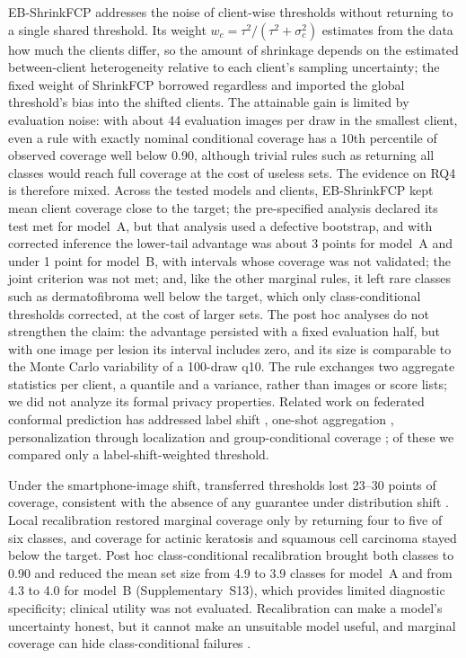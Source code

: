 \documentclass[VANCOUVER,Times1COL]{WileyNJDv5}
\begin{document}
EB-ShrinkFCP addresses the noise of client-wise thresholds without returning to a single shared threshold.
Its weight $w_c=\tau^2/(\tau^2+\sigma_c^2)$ estimates from the data how much the clients differ, so the amount of shrinkage depends on the estimated between-client heterogeneity relative to each client's sampling uncertainty; the fixed weight of ShrinkFCP borrowed regardless and imported the
global threshold's bias into the shifted clients. The attainable gain is limited by evaluation noise: with
about 44 evaluation images per draw in the smallest client, even a rule with exactly nominal conditional
coverage has a 10th percentile of observed coverage well below 0.90, although trivial rules such as
returning all classes would reach full coverage at the cost of useless sets. The evidence on RQ4 is
therefore mixed. Across the tested models and clients, EB-ShrinkFCP kept mean client coverage close to the
target; the pre-specified analysis declared its test met for model~A, but that analysis used a defective bootstrap, and with corrected inference the lower-tail advantage was about 3 points for model~A and under 1 point for model~B, with intervals whose coverage was not validated; the joint criterion was not met; and, like the other marginal rules, it left rare classes such as dermatofibroma well below the
target, which only class-conditional thresholds corrected, at the cost of larger sets. The post hoc analyses do not strengthen the claim: the advantage persisted with a fixed evaluation half, but with one image per lesion its interval includes zero, and its size is comparable to the Monte Carlo variability of a 100-draw q10. The rule exchanges two
aggregate statistics per client, a quantile and a variance, rather than images or score lists; we did not
analyze its formal privacy properties. Related work on federated conformal prediction has addressed label
shift \cite{plassier2023labelshift}, one-shot aggregation \cite{humbert2023oneshot}, personalization
through localization \cite{min2025pfcp} and group-conditional coverage \cite{wen2026gcfcp}; of these we
compared only a label-shift-weighted threshold.

Under the smartphone-image shift, transferred thresholds lost 23--30 points of coverage, consistent with the
absence of any guarantee under distribution shift \cite{tibshirani2019covariate,barber2023beyond}. Local
recalibration restored marginal coverage only by returning four to five of six classes, and coverage for
actinic keratosis and squamous cell carcinoma stayed below the target. Post hoc class-conditional
recalibration brought both classes to 0.90 and reduced the mean set size from 4.9 to 3.9 classes for
model~A and from 4.3 to 4.0 for model~B (Supplementary~S13), which provides limited diagnostic specificity; clinical utility was not evaluated.
Recalibration can make a model's
uncertainty honest, but it cannot make an unsuitable model useful, and marginal coverage can hide
class-conditional failures \cite{lu2022fair}.
\end{document}
